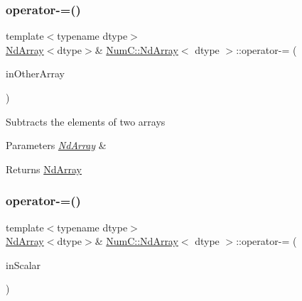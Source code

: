 \subsubsection{\texorpdfstring{operator-\/=()}{operator-=()}\hspace{0.1cm}{\footnotesize\ttfamily [1/2]}}
{\footnotesize\ttfamily template$<$typename dtype$>$ \\
\mbox{\hyperlink{class_num_c_1_1_nd_array}{Nd\+Array}}$<$dtype$>$\& \mbox{\hyperlink{class_num_c_1_1_nd_array}{Num\+C\+::\+Nd\+Array}}$<$ dtype $>$\+::operator-\/= (\begin{DoxyParamCaption}\item[{const \mbox{\hyperlink{class_num_c_1_1_nd_array}{Nd\+Array}}$<$ dtype $>$ \&}]{in\+Other\+Array }\end{DoxyParamCaption})\hspace{0.3cm}{\ttfamily [inline]}}

Subtracts the elements of two arrays


\begin{DoxyParams}{Parameters}
{\em \mbox{\hyperlink{class_num_c_1_1_nd_array}{Nd\+Array}}} & \\
\hline
\end{DoxyParams}
\begin{DoxyReturn}{Returns}
\mbox{\hyperlink{class_num_c_1_1_nd_array}{Nd\+Array}} 
\end{DoxyReturn}
\mbox{\label{class_num_c_1_1_nd_array_a96520616f12f0a65f380aabd0e8a8e4e}} 
\subsubsection{\texorpdfstring{operator-\/=()}{operator-=()}\hspace{0.1cm}{\footnotesize\ttfamily [2/2]}}
{\footnotesize\ttfamily template$<$typename dtype$>$ \\
\mbox{\hyperlink{class_num_c_1_1_nd_array}{Nd\+Array}}$<$dtype$>$\& \mbox{\hyperlink{class_num_c_1_1_nd_array}{Num\+C\+::\+Nd\+Array}}$<$ dtype $>$\+::operator-\/= (\begin{DoxyParamCaption}\item[{dtype}]{in\+Scalar }\end{DoxyParamCaption})\hspace{0.3cm}{\ttfamily [inline]}}

